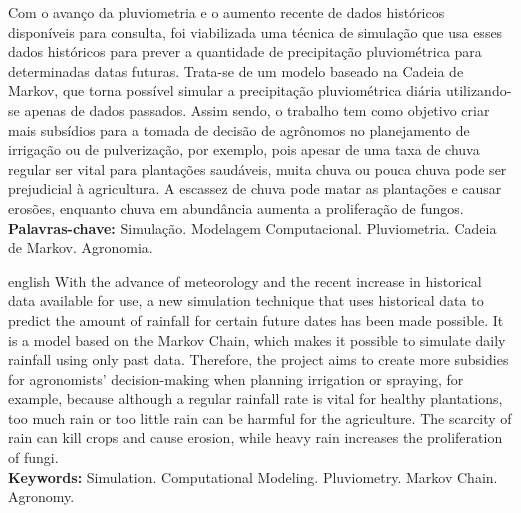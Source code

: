 \documentclass[
	12pt,				%
	openright,			%
	oneside,			%
	a4paper,			%
	english,			%
	french,				%
	spanish,			%
	brazil,				%
	]{lib/abntex2}
\begin{document}

\setlength{\absparsep}{18pt} %
\begin{resumo}
	Com o avanço da pluviometria e o aumento recente de dados históricos disponíveis para consulta, foi viabilizada uma técnica de simulação que usa esses dados históricos para prever a quantidade de precipitação pluviométrica para determinadas datas futuras. Trata-se de um modelo baseado na Cadeia de Markov, que torna possível simular a precipitação pluviométrica diária utilizando-se apenas de dados passados.
	Assim sendo, o trabalho tem como objetivo criar mais subsídios para a tomada de decisão de agrônomos no planejamento de irrigação ou de pulverização, por exemplo, pois apesar de uma taxa de chuva regular ser vital para plantações saudáveis, muita chuva ou pouca chuva pode ser prejudicial à agricultura. A escassez de chuva pode matar as plantações e causar erosões, enquanto chuva em abundância aumenta a proliferação de fungos.\\
	\textbf{Palavras-chave:} Simulação. Modelagem Computacional. Pluviometria. Cadeia de Markov. Agronomia.
\end{resumo}

\begin{resumo}[Abstract]
	\begin{otherlanguage*}{english}
		With the advance of meteorology and the recent increase in historical data available for use, a new simulation technique that uses historical data to predict the amount of rainfall for certain future dates has been made possible. It is a model based on the Markov Chain, which makes it possible to simulate daily rainfall using only past data.
		Therefore, the project aims to create more subsidies for agronomists' decision-making when planning irrigation or spraying, for example, because although a regular rainfall rate is vital for healthy plantations, too much rain or too little rain can be harmful for the agriculture. The scarcity of rain can kill crops and cause erosion, while heavy rain increases the proliferation of fungi.\\
		\textbf{Keywords:} Simulation. Computational Modeling. Pluviometry. Markov Chain. Agronomy.
	\end{otherlanguage*}
\end{resumo}


\end{document}
